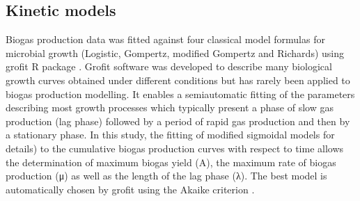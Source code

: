 \subsection{Kinetic models}
Biogas production data was fitted against four classical model formulas for microbial growth (Logistic, Gompertz, modified Gompertz and Richards) using grofit R package \cite{Kahm_2010}. Grofit software was developed to describe many biological growth curves obtained under different conditions but has rarely been applied to biogas production modelling. It enables a semiautomatic fitting of the parameters describing most growth processes which typically present a phase of slow gas production (lag phase) followed by a period of rapid gas production and then by a stationary phase. In this study, the fitting of modified sigmoidal models \cite{Zwietering1990} for details) to the cumulative biogas production curves  with respect to time allows the determination of maximum biogas yield (A), the maximum rate of biogas production (μ) as well as the length of the lag phase (λ). The best model is automatically chosen by grofit using the Akaike criterion \cite{Hasenbrink_2006}.